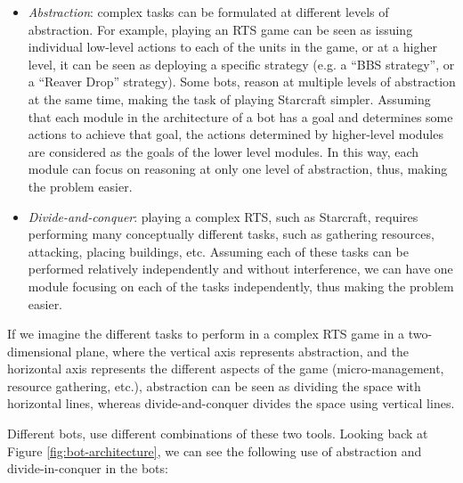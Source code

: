 \documentclass[journal]{IEEEtran}
\begin{document}
\begin{itemize}
\item {\em Abstraction}: complex tasks can be formulated at different levels of abstraction. For example, playing an RTS game can be seen as issuing individual low-level actions to each of the units in the game, or at a higher level, it can be seen as deploying a specific strategy (e.g. a ``BBS strategy'', or a ``Reaver Drop'' strategy). Some bots, reason at multiple levels of abstraction at the same time, making the task of playing Starcraft simpler. Assuming that each module in the architecture of a bot has a goal and determines some actions to achieve that goal, the actions determined by higher-level modules are considered as the goals of the lower level modules. In this way, each module can focus on reasoning at only one level of abstraction, thus, making the problem easier.

\item {\em Divide-and-conquer}: playing a complex RTS, such as Starcraft, requires performing many conceptually different tasks, such as gathering resources, attacking, placing buildings, etc. Assuming each of these tasks can be performed relatively independently and without interference, we can have one module focusing on each of the tasks independently, thus making the problem easier. 
\end{itemize}

If we imagine the different tasks to perform in a complex RTS game in a two-dimensional plane, where the vertical axis represents abstraction, and the horizontal axis represents the different aspects of the game (micro-management, resource gathering, etc.), abstraction can be seen as dividing the space with horizontal lines, whereas divide-and-conquer divides the space using vertical lines.

Different bots, use different combinations of these two tools. Looking back at Figure \ref{fig:bot-architecture}, we can see the following use of abstraction and divide-in-conquer in the bots:
\end{document}
